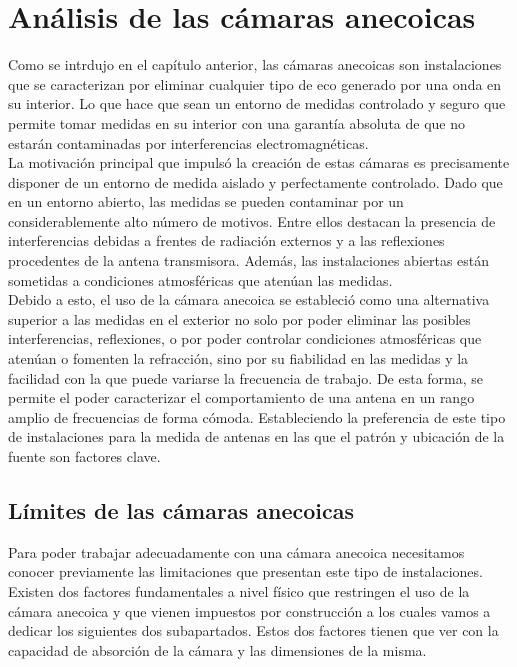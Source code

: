 
\chapter{Análisis de las cámaras anecoicas}
\label{cha:Análisis de las cámaras anecoicas}

Como se intrdujo en el capítulo anterior, las cámaras anecoicas son instalaciones que se caracterizan por eliminar cualquier tipo de eco generado por una onda en su interior. Lo que hace que sean un entorno de medidas controlado y seguro que permite tomar medidas en su interior con una garantía absoluta de que no estarán contaminadas por interferencias electromagnéticas.\\

La motivación principal que impulsó la creación de estas cámaras es precisamente disponer de un entorno de medida aislado y perfectamente controlado. Dado que en un entorno abierto, las medidas se pueden contaminar por un considerablemente alto número de motivos. Entre ellos destacan la presencia de interferencias debidas a frentes de radiación externos y a las reflexiones procedentes de la antena transmisora. Además, las instalaciones abiertas están sometidas a condiciones atmosféricas que atenúan las medidas.\\

Debido a esto, el uso de la cámara anecoica se estableció como una alternativa superior a las medidas en el exterior no solo por poder eliminar las posibles interferencias, reflexiones, o por poder controlar condiciones atmosféricas que atenúan o fomenten la refracción, sino por su fiabilidad en las medidas y la facilidad con la que puede variarse la frecuencia de trabajo. De esta forma, se permite el poder caracterizar el comportamiento de una antena en un rango amplio de frecuencias de forma cómoda. Estableciendo la preferencia de este tipo de instalaciones para la medida de antenas en las que el patrón y ubicación de la fuente son factores clave. 

\newpage

\section{Límites de las cámaras anecoicas}

Para poder trabajar adecuadamente con una cámara anecoica necesitamos conocer previamente las limitaciones que presentan este tipo de instalaciones. Existen dos factores fundamentales a nivel físico que restringen el uso de la cámara anecoica y que vienen impuestos por construcción a los cuales vamos a dedicar los siguientes dos subapartados. Estos dos factores tienen que ver con la capacidad de absorción de la cámara y las dimensiones de la misma. 


